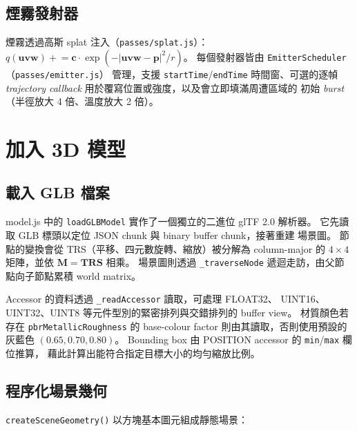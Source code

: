 \documentclass[a4paper, 12pt]{article}
\begin{document}
\subsection{煙霧發射器}

煙霧透過高斯 splat 注入（\texttt{passes/splat.js}）：
$q(\mathbf{uvw}) \mathrel{+}= \mathbf{c}\cdot
\exp(-|\mathbf{uvw}-\mathbf{p}|^2/r)$。
每個發射器皆由 \texttt{EmitterScheduler}（\texttt{passes/emitter.js}）
管理，支援 \texttt{startTime}/\texttt{endTime} 時間窗、可選的逐幀
\emph{trajectory callback} 用於覆寫位置或強度，以及會立即填滿周遭區域的
初始 \emph{burst}（半徑放大 4 倍、溫度放大 2 倍）。

\section{加入 3D 模型}

\subsection{載入 GLB 檔案}

model.js 中的 \texttt{loadGLBModel} 實作了一個獨立的二進位 glTF 2.0
解析器。
它先讀取 GLB 標頭以定位 JSON chunk 與 binary buffer chunk，接著重建
場景圖。
節點的變換會從 TRS（平移、四元數旋轉、縮放）被分解為 column-major 的
$4\times4$ 矩陣，並依 $\mathbf{M}=\mathbf{T}\mathbf{R}\mathbf{S}$ 相乘。
場景圖則透過 \texttt{\_traverseNode} 遞迴走訪，由父節點向子節點累積
world matrix。

Accessor 的資料透過 \texttt{\_readAccessor} 讀取，可處理 FLOAT32、
UINT16、UINT32、UINT8 等元件型別的緊密排列與交錯排列的 buffer view。
材質顏色若存在 \texttt{pbrMetallicRoughness} 的 base-colour factor
則由其讀取，否則使用預設的灰藍色 $(0.65,0.70,0.80)$。
Bounding box 由 POSITION accessor 的 \texttt{min}/\texttt{max} 欄位推算，
藉此計算出能符合指定目標大小的均勻縮放比例。

\subsection{程序化場景幾何}

\texttt{createSceneGeometry()} 以方塊基本圖元組成靜態場景：
\end{document}

